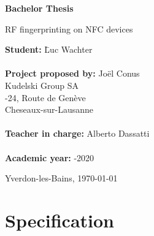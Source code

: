 \documentclass[paper=a4, fontsize=11pt]{scrartcl}
\begin{document}
\begin{titlepage}
  \thispagestyle{firstpage}
  \begin{center}
    \vspace*{5cm}

    \Huge
    \textbf{Bachelor Thesis}

    \vspace{1.5cm}
    \LARGE
    RF fingerprinting on NFC devices
  \end{center}

  \vspace{6cm}
  \begin{tabbing}
    \linespread{3}\textbf{Student:} \hspace{12em} \= Luc Wachter\\\\

    \textbf{Project proposed by:} \> Joël Conus\\
    \> Kudelski Group SA\\
    -24, Route de Genève\\
     Cheseaux-sur-Lausanne\\\\

    \textbf{Teacher in charge:} \> Alberto Dassatti\\\\

    \textbf{Academic year:} -2020
  \end{tabbing}

  \vspace{3cm}
  \begin{flushright}
    Yverdon-les-Bains, \today
  \end{flushright}
\end{titlepage}

\newpage
\section{Specification} %

\newpage
\renewcommand{\contentsname}{Table of contents}
\tableofcontents
\newpage
\end{document}
